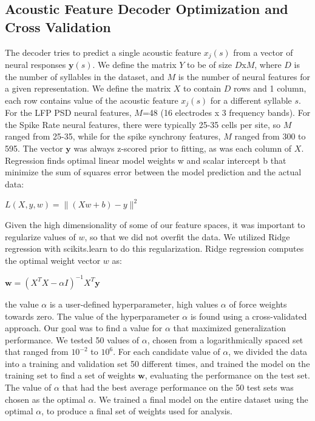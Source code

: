 \subsection{Acoustic Feature Decoder Optimization and Cross Validation}

The decoder tries to predict a single acoustic feature $x_j (s)$ from a vector of neural responses $\textbf{y}(s)$. We define the matrix $Y$ to be of size $D$x$M$, where $D$ is the number of syllables in the dataset, and $M$ is the number of neural features for a given representation. We define the matrix $X$ to contain $D$ rows and 1 column, each row contains value of the acoustic feature $x_j(s)$ for a different syllable $s$. For the LFP PSD neural features, $M$=48 (16 electrodes x 3 frequency bands). For the Spike Rate neural features, there were typically 25-35 cells per site, so $M$ ranged from 25-35, while for the spike synchrony features, $M$ ranged from 300 to 595. The vector $\textbf{y}$ was always z-scored prior to fitting, as was each column of $X$.
    Regression finds optimal linear model weights w and scalar intercept b that minimize the sum of squares error between the model prediction and the actual data:

\begin{center}
$L(X, y, w) = \| (Xw + b) - y \| ^2$
\end{center}

Given the high dimensionality of some of our feature spaces, it was important to regularize values of $w$, so that we did not overfit the data. We utilized Ridge regression with scikits.learn to do this regularization. Ridge regression computes the optimal weight vector $w$ as:

\begin{center}
$\textbf{w} = (X^T X - \alpha I)^{-1} X^T \textbf{y}$
\end{center}

the value $\alpha$ is a user-defined hyperparameter, high values $\alpha$ of force weights towards zero.
The value of the hyperparameter $\alpha$ is found using a cross-validated approach. Our goal was to find a value for $\alpha$ that maximized generalization performance. We tested 50 values of $\alpha$, chosen from a logarithmically spaced set that ranged from $10^{-2}$ to $10^6$. For each candidate value of $\alpha$, we divided the data into a training and validation set 50 different times, and trained the model on the training set to find a set of weights $\textbf{w}$, evaluating the performance on the test set. The value of $\alpha$ that had the best average performance on the 50 test sets was chosen as the optimal $\alpha$. We trained a final model on the entire dataset using the optimal $\alpha$, to produce a final set of weights used for analysis.

